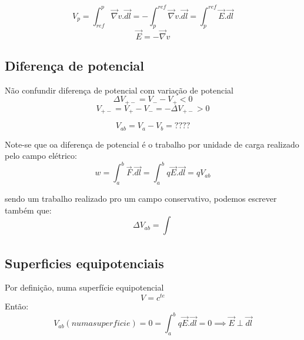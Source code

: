 \documentclass[a4paper]{article}
\begin{document}
\[V_p = \int_{ref}^{p}\vec{\nabla}v.\vec{dl}= -\int_{p}^{ref}\vec{\nabla}v.\vec{dl}= \int_{p}^{ref}\vec{E}.\vec{dl}\]
\[\vec{E} = -\vec{\nabla}v\]

\subsection{Diferença de potencial}
Não confundir diferença de potencial com variação de potencial
\[\Delta V_{+-} = V_- - V_+ < 0\]
\[V_{+-} = V_+ - V_-  = -\Delta V_{+-} > 0\]

\[V_{ab}=V_a - V_b = ????\]

Note-se que oa diferença de potencial é o trabalho por unidade de carga realizado pelo campo elétrico:
\[w= \int_{a}^{b}\vec{F}.\vec{dl}= \int_{a}^{b}q\vec{E}.\vec{dl}=qV_{ab}\]

sendo um trabalho realizado pro um campo conservativo, podemos escrever também que:
\[\Delta V_{ab}= \int_{}^{} \]

\subsection{Superficies equipotenciais}
Por definição, numa superfície equipotencial
\[V = c^{te}\]
Então:
\[V_{ab}(numa superficie) = 0 = \int_{a}^{b}q\vec{E}.\vec{dl} = 0 \implies \vec{E} \perp \vec{dl}\]
\end{document}
